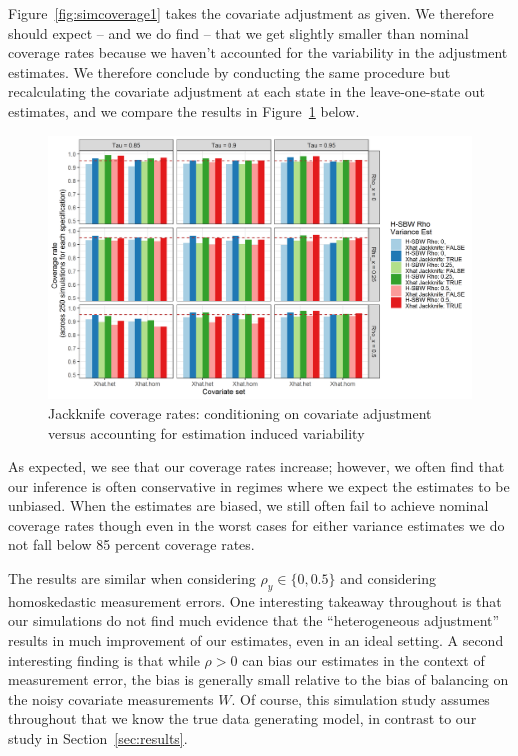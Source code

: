 Figure~\ref{fig:simcoverage1} takes the covariate adjustment as given. We therefore should expect -- and we do find -- that we get slightly smaller than nominal coverage rates because we haven't accounted for the variability in the adjustment estimates. We therefore conclude by conducting the same procedure but recalculating the covariate adjustment at each state in the leave-one-state out estimates, and we compare the results in Figure~\ref{fig:simcoverage2} below.

\begin{figure}[H]\label{fig:simcoverage2}
\begin{center}
    \caption{Jackknife coverage rates: conditioning on covariate adjustment versus accounting for estimation induced variability}\label{fig:simcoverage2}
    \includegraphics[scale=0.5]{01_Plots/coverage-plot-2.png}
\end{center}
\end{figure}

As expected, we see that our coverage rates increase; however, we often find that our inference is often conservative in regimes where we expect the estimates to be unbiased. When the estimates are biased, we still often fail to achieve nominal coverage rates though even in the worst cases for either variance estimates we do not fall below 85 percent coverage rates.

The results are similar when considering $\rho_y \in \{0, 0.5\}$ and considering homoskedastic measurement errors. One interesting takeaway throughout is that our simulations do not find much evidence that the ``heterogeneous adjustment'' results in much improvement of our estimates, even in an ideal setting. A second interesting finding is that while $\rho > 0$ can bias our estimates in the context of measurement error, the bias is generally small relative to the bias of balancing on the noisy covariate measurements $W$. Of course, this simulation study assumes throughout that we know the true data generating model, in contrast to our study in Section~\ref{sec:results}.